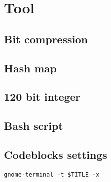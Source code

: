 \section{Tool}
\subsection{Bit compression}

\subsection{Hash map}

\subsection{120 bit integer}

\subsection{Bash script}

\subsection{Codeblocks settings}
	\begin{lstlisting}
gnome-terminal -t $TITLE -x
	\end{lstlisting}

